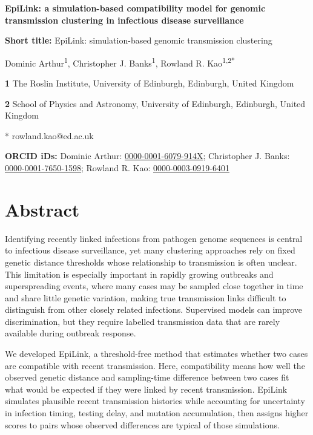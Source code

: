 \documentclass[10pt,letterpaper]{article}
\begin{document}
\vspace*{0.2in}
\begin{flushleft}

	{\Large\bfseries EpiLink: a simulation-based compatibility model for genomic transmission clustering in infectious disease surveillance}

	\medskip
	\textbf{Short title:} EpiLink: simulation-based genomic transmission clustering

	\bigskip

	Dominic Arthur\textsuperscript{1},
	Christopher J. Banks\textsuperscript{1},
	Rowland R. Kao\textsuperscript{1,2*}

	\bigskip

	\textbf{1} The Roslin Institute, University of Edinburgh, Edinburgh, United Kingdom

	\textbf{2} School of Physics and Astronomy, University of Edinburgh, Edinburgh, United Kingdom

	\bigskip

	* rowland.kao@ed.ac.uk

	\bigskip

	\textbf{ORCID iDs:}
	Dominic Arthur: \href{https://orcid.org/0000-0001-6079-914X}{0000-0001-6079-914X};
	Christopher J. Banks: \href{https://orcid.org/0000-0001-7650-1598}{0000-0001-7650-1598};
	Rowland R. Kao: \href{https://orcid.org/0000-0003-0919-6401}{0000-0003-0919-6401}
\end{flushleft}

\section*{Abstract}
Identifying recently linked infections from pathogen genome sequences is central to infectious disease surveillance, yet many clustering approaches rely on fixed genetic distance thresholds whose relationship to transmission is often unclear. This limitation is especially important in rapidly growing outbreaks and superspreading events, where many cases may be sampled close together in time and share little genetic variation, making true transmission links difficult to distinguish from other closely related infections. Supervised models can improve discrimination, but they require labelled transmission data that are rarely available during outbreak response.

We developed EpiLink, a threshold-free method that estimates whether two cases are compatible with recent transmission. Here, compatibility means how well the observed genetic distance and sampling-time difference between two cases fit what would be expected if they were linked by recent transmission. EpiLink simulates plausible recent transmission histories while accounting for uncertainty in infection timing, testing delay, and mutation accumulation, then assigns higher scores to pairs whose observed differences are typical of those simulations.
\end{document}
